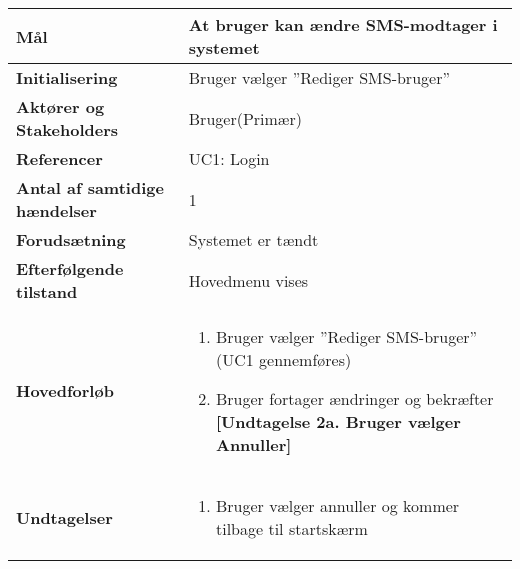 \begin{table}[H] \centering
\begin{tabular}{|p{6cm}|p{8cm}|}
	\hline
\textbf{Mål} &
At bruger kan ændre SMS-modtager i systemet\\\hline

\textbf{Initialisering} &
  Bruger vælger ''Rediger SMS-bruger'' \\\hline
 
\textbf{Aktører og Stakeholders} &
Bruger(Primær) \\\hline

\textbf{Referencer} &
UC1: Login  \\\hline

\textbf{Antal af samtidige hændelser} &
1  \\\hline

\textbf{Forudsætning} &
Systemet er tændt  \\\hline

\textbf{Efterfølgende tilstand} &
Hovedmenu vises  \\\hline

\textbf{Hovedforløb} &
\begin{enumerate}

\item Bruger vælger ''Rediger SMS-bruger'' \newline (UC1 gennemføres)
\item Bruger fortager ændringer og bekræfter \newline
\textbf{[Undtagelse 2a. Bruger vælger Annuller]}

\end{enumerate}   
 \\\hline
 
\textbf{Undtagelser}
&\begin{enumerate}[label= 2a.]
\item Bruger vælger annuller og kommer tilbage til startskærm
\end{enumerate}
 \\\hline
 

	\end{tabular}
	\label{UC6} 
\end{table}